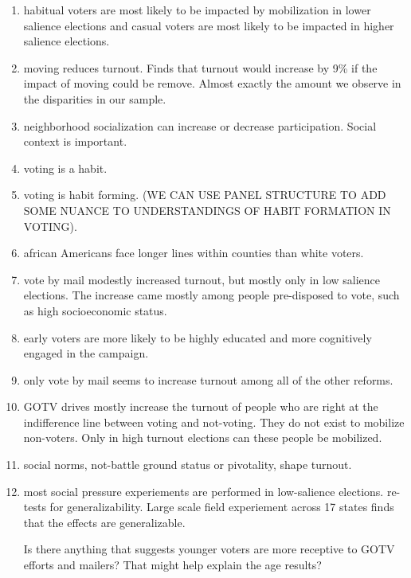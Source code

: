 \documentclass[12pt]{article}
\begin{document}
\begin{enumerate}
\item \citet{malhotra2011text} habitual voters are most likely to be impacted by mobilization in lower salience elections and casual voters are most likely to be impacted in higher salience elections. 

\item \citet{squire1987residential} moving reduces turnout. Finds that turnout would increase by 9\% if the impact of moving could be remove. Almost exactly the amount we observe in the disparities in our sample. 

\item \citet{cho2006residential} neighborhood socialization can increase or decrease participation. Social context is important. 


\item \citet{brody1977life} voting is a habit. 

\item \citet{gerber2003voting} voting is habit forming. (WE CAN USE PANEL STRUCTURE TO ADD SOME NUANCE TO UNDERSTANDINGS OF HABIT FORMATION IN VOTING). 

\item \citet{pettigrew2017racial} african Americans face longer lines within counties than white voters. 

\item \citet{karp2000going} vote by mail modestly increased turnout, but mostly only in low salience elections. The increase came mostly among people pre-disposed to vote, such as high socioeconomic status. 


\item \citet{gronke2008psychological} early voters are more likely to be highly educated and more cognitively engaged in the campaign. 

\item \citet{gronke2007early} only vote by mail seems to increase turnout among all of the other reforms.

\item \citet{arceneaux2009mobilized} GOTV drives mostly increase the turnout of people who are right at the indifference line between voting and not-voting. They do not exist to mobilize non-voters. Only in high turnout elections can these people be mobilized. 

\item \citet{doherty2017voting} social norms, not-battle ground status or pivotality, shape turnout. 

\item \citet{gerber2017generalizability} most social pressure experiements are performed in low-salience elections. re-tests for generalizability. Large scale field experiement across 17 states finds that the effects are generalizable. 



Is there anything that suggests younger voters are more receptive to GOTV efforts and mailers?  That might help explain the age results?




\end{enumerate}




\newpage



\end{document}
